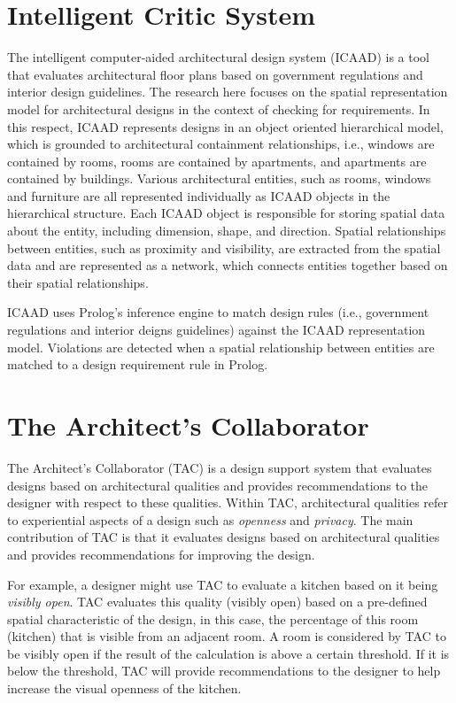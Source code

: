 \documentclass[12pt]{ucthesis}
\begin{document}
\section{Intelligent Critic System}
The intelligent computer-aided architectural design system (ICAAD) \cite{IntelligentCritic} is a tool that evaluates architectural floor plans based on government regulations and interior design guidelines. The research here focuses on the spatial representation model for architectural designs in the context of checking for requirements. In this respect, ICAAD represents designs in an object oriented hierarchical model, which is grounded to architectural containment relationships, i.e., windows are contained by rooms, rooms are contained by apartments, and apartments are contained by buildings. Various architectural entities, such as rooms, windows and furniture are all represented individually as ICAAD objects in the hierarchical structure. Each ICAAD object is responsible for storing spatial data about the entity, including dimension, shape, and direction. Spatial relationships between entities, such as proximity and visibility, are extracted from the spatial data and are represented as a network, which connects entities together based on their spatial relationships. 

ICAAD uses Prolog's inference engine to match design rules (i.e., government regulations and interior deigns guidelines) against the ICAAD representation model. Violations are detected when a spatial relationship between entities are matched to a design requirement rule in Prolog.


\section{The Architect's Collaborator}
The Architect's Collaborator (TAC) \cite{KoileTAC} is a design support system that evaluates designs based on architectural qualities and provides recommendations to the designer with respect to these qualities. Within TAC, architectural qualities refer to experiential aspects of a design such as \emph{openness} and \emph{privacy}. The main contribution of TAC is that it evaluates designs based on architectural qualities and provides recommendations for improving the design.

For example, a designer might use TAC to evaluate a kitchen based on it being \emph{visibly open}. TAC evaluates this quality (visibly open) based on a pre-defined spatial characteristic of the design, in this case, the percentage of this room (kitchen) that is visible from an adjacent room. A room is considered by TAC to be visibly open if the result of the calculation is above a certain threshold. If it is below the threshold, TAC will provide recommendations to the designer to help increase the visual openness of the kitchen. 
\end{document}

